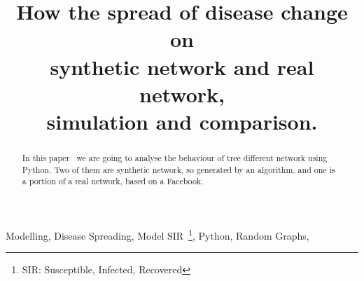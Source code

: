 \documentclass[conference]{IEEEtran}
\begin{document}
\title{How the spread of disease change on\\ synthetic network and real network,\\ simulation and comparison.\\
}

\author{
    \and
}

\maketitle

\begin{abstract}
In this paper~\cite{thisPaper} we are going to analyse the behaviour of tree different network using Python. Two of them are synthetic network, so generated by an algorithm, and one is a portion of a real network, based on a Facebook.
\end{abstract}

\begin{IEEEkeywords}
Modelling, Disease Spreading, Model SIR~\footnote{\label{fnote:SIR}SIR: Susceptible, Infected, Recovered}, Python, Random Graphs, 
\end{IEEEkeywords}









\end{document}
